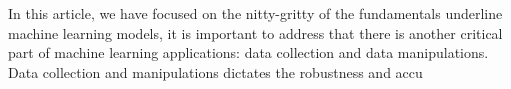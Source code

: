 In this article, we have focused on the nitty-gritty of the fundamentals underline machine learning models, it is important to address that there is another critical part of machine learning applications: data collection and data manipulations. Data collection and manipulations dictates the robustness and accu